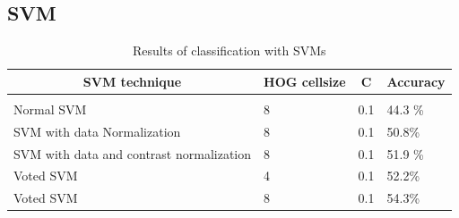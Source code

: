 \documentclass{article} %
\begin{document}
\subsection{SVM}
\begin{table}[t]
    \begin{center}
        \begin{tabular}{llll}
        \multicolumn{1}{c}{\bf SVM technique}  & \multicolumn{1}{c}{\bf HOG cellsize} & \multicolumn{1}{c}{\bf C} & \multicolumn{1}{c}{\bf Accuracy}
        \\ \hline \\
        Normal SVM &8 & 0.1        & 44.3 \% \\
        SVM with data Normalization   &8 & 0.1          & 50.8\% \\
        SVM with data and contrast normalization &8 & 0.1&51.9 \% \\
        Voted SVM	&4 & 0.1 & 52.2\% \\
        Voted SVM	&8 & 0.1 & 54.3\% \\
        \end{tabular}
    \end{center}
    \caption{Results of classification with SVMs}
    \label{tab:svm}
\end{table}
\end{document}
